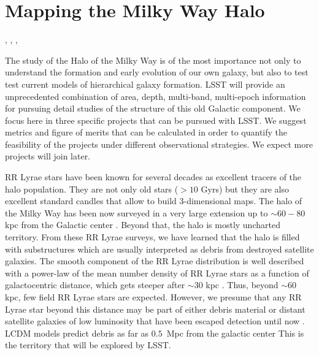 %
%
%
%
%
%
%

\section{Mapping the Milky Way Halo}
\def\secname{MW_Halo}\label{sec:\secname} %

, , , 


The study of the Halo of the Milky Way is of the most importance not only to understand
the formation and early evolution of our own galaxy, but also to test 
test current models of hierarchical galaxy formation. 
LSST will provide an unprecedented combination of
area, depth, multi-band, multi-epoch information for pursuing detail studies
of the structure of this old Galactic component. We focus here in three
specific projects that can be pursued with LSST. We suggest metrics and figure of merits that can
be calculated in order to quantify the feasibility of the projects under different
observational strategies. We expect more projects will join later.

RR Lyrae stars have been known for several decades as excellent tracers
of the halo population. They are not only old stars ($>10$ Gyrs) but they are
also excellent standard candles that allow to build 3-dimensional maps. 
The halo of the Milky Way has been now surveyed in a very large extension up to 
$\sim 60-80$ kpc from the Galactic center \citep[][among others]{drake13a,drake13b,zinn14,torrealba15}. 
Beyond that, the halo is
mostly uncharted territory.
From these RR Lyrae surveys, we have learned that the halo is filled with substructures
which are usually interpreted as debris from destroyed satellite galaxies. The smooth 
component of the RR Lyrae distribution is well described
with a power-law of the mean number density of RR Lyrae stars as a function of
galactocentric distance, which gets steeper after $\sim 30$ kpc \citep{zinn14}. 
Thus, beyond $\sim 60$ kpc, few field RR Lyrae stars are expected. However, we presume that 
any RR Lyrae star beyond this distance may be part of either debris material or distant
satellite galaxies of low luminosity that have been escaped detection until now \citep{sesar14,baker15}. 
LCDM models predict debris as far as $0.5$~Mpc from the galactic center
This is the territory that will be explored by LSST.

